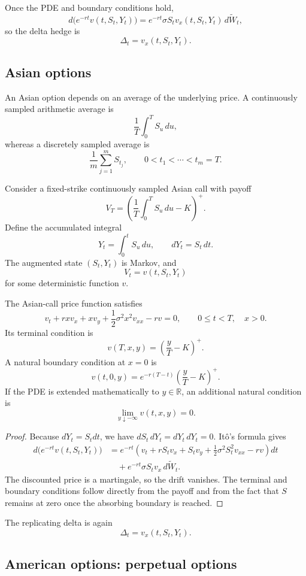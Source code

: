 Once the PDE and boundary conditions hold,
\[
d\bigl(e^{-rt}v(t,S_t,Y_t)\bigr)
=e^{-rt}\sigma S_tv_x(t,S_t,Y_t)\,d\widetilde W_t,
\]
so the delta hedge is
\[
\Delta_t=v_x(t,S_t,Y_t).
\]

\subsection{Asian options}

An Asian option depends on an average of the underlying price. A continuously sampled arithmetic average is
\[
\frac{1}{T}\int_0^TS_u\,du,
\]
whereas a discretely sampled average is
\[
\frac{1}{m}\sum_{j=1}^mS_{t_j},
\qquad
0<t_1<\cdots<t_m=T.
\]

Consider a fixed-strike continuously sampled Asian call with payoff
\[
V_T=\left(\frac1T\int_0^TS_u\,du-K\right)^+.
\]
Define the accumulated integral
\[
Y_t=\int_0^tS_u\,du,
\qquad
dY_t=S_t\,dt.
\]
The augmented state $(S_t,Y_t)$ is Markov, and
\[
V_t=v(t,S_t,Y_t)
\]
for some deterministic function $v$.

\begin{thm}
The Asian-call price function satisfies
\[
v_t+rxv_x+xv_y+\frac12\sigma^2x^2v_{xx}-rv=0,
\qquad
0\leq t<T,
\quad x>0.
\]
Its terminal condition is
\[
v(T,x,y)=\left(\frac{y}{T}-K\right)^+.
\]
A natural boundary condition at $x=0$ is
\[
v(t,0,y)
=e^{-r(T-t)}\left(\frac{y}{T}-K\right)^+.
\]
If the PDE is extended mathematically to $y\in\mathbb{R}$, an additional natural condition is
\[
\lim_{y\downarrow-\infty}v(t,x,y)=0.
\]
\end{thm}

\begin{proof}
Because $dY_t=S_tdt$, we have $dS_t\,dY_t=dY_t\,dY_t=0$. It\^o's formula gives
\[
\begin{aligned}
d\bigl(e^{-rt}v(t,S_t,Y_t)\bigr)
&=e^{-rt}
 \left(v_t+rS_tv_x+S_tv_y
 +\frac12\sigma^2S_t^2v_{xx}-rv\right)dt\\
&\quad+e^{-rt}\sigma S_tv_x\,d\widetilde W_t.
\end{aligned}
\]
The discounted price is a martingale, so the drift vanishes. The terminal and boundary conditions follow directly from the payoff and from the fact that $S$ remains at zero once the absorbing boundary is reached.
\end{proof}

The replicating delta is again
\[
\Delta_t=v_x(t,S_t,Y_t).
\]

\subsection{American options: perpetual options}

